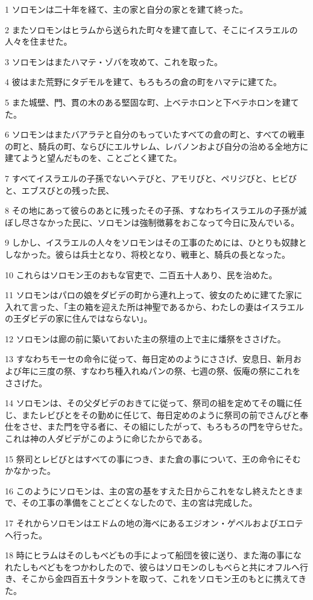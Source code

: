 \par 1 ソロモンは二十年を経て、主の家と自分の家とを建て終った。
\par 2 またソロモンはヒラムから送られた町々を建て直して、そこにイスラエルの人々を住ませた。
\par 3 ソロモンはまたハマテ・ゾバを攻めて、これを取った。
\par 4 彼はまた荒野にタデモルを建て、もろもろの倉の町をハマテに建てた。
\par 5 また城壁、門、貫の木のある堅固な町、上ベテホロンと下ベテホロンを建てた。
\par 6 ソロモンはまたバアラテと自分のもっていたすべての倉の町と、すべての戦車の町と、騎兵の町、ならびにエルサレム、レバノンおよび自分の治める全地方に建てようと望んだものを、ことごとく建てた。
\par 7 すべてイスラエルの子孫でないヘテびと、アモリびと、ペリジびと、ヒビびと、エブスびとの残った民、
\par 8 その地にあって彼らのあとに残ったその子孫、すなわちイスラエルの子孫が滅ぼし尽さなかった民に、ソロモンは強制徴募をおこなって今日に及んでいる。
\par 9 しかし、イスラエルの人々をソロモンはその工事のためには、ひとりも奴隷としなかった。彼らは兵士となり、将校となり、戦車と、騎兵の長となった。
\par 10 これらはソロモン王のおもな官吏で、二百五十人あり、民を治めた。
\par 11 ソロモンはパロの娘をダビデの町から連れ上って、彼女のために建てた家に入れて言った、「主の箱を迎えた所は神聖であるから、わたしの妻はイスラエルの王ダビデの家に住んではならない」。
\par 12 ソロモンは廊の前に築いておいた主の祭壇の上で主に燔祭をささげた。
\par 13 すなわちモーセの命令に従って、毎日定めのようにささげ、安息日、新月および年に三度の祭、すなわち種入れぬパンの祭、七週の祭、仮庵の祭にこれをささげた。
\par 14 ソロモンは、その父ダビデのおきてに従って、祭司の組を定めてその職に任じ、またレビびとをその勤めに任じて、毎日定めのように祭司の前でさんびと奉仕をさせ、また門を守る者に、その組にしたがって、もろもろの門を守らせた。これは神の人ダビデがこのように命じたからである。
\par 15 祭司とレビびとはすべての事につき、また倉の事について、王の命令にそむかなかった。
\par 16 このようにソロモンは、主の宮の基をすえた日からこれをなし終えたときまで、その工事の準備をことごとくなしたので、主の宮は完成した。
\par 17 それからソロモンはエドムの地の海べにあるエジオン・ゲベルおよびエロテへ行った。
\par 18 時にヒラムはそのしもべどもの手によって船団を彼に送り、また海の事になれたしもべどもをつかわしたので、彼らはソロモンのしもべらと共にオフルへ行き、そこから金四百五十タラントを取って、これをソロモン王のもとに携えてきた。

